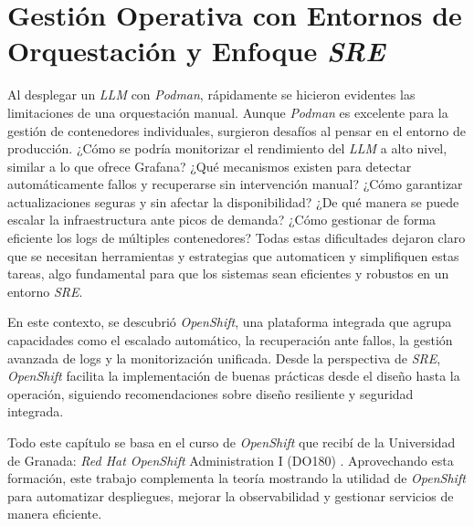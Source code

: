 \chapter{Gestión Operativa con Entornos de Orquestación y Enfoque \textit{SRE}}
Al desplegar un \textit{LLM} con \textit{Podman}, rápidamente se hicieron evidentes las limitaciones de una orquestación manual. Aunque \textit{Podman} es excelente para la gestión de contenedores individuales, surgieron desafíos al pensar en el entorno de producción. ¿Cómo se podría monitorizar el rendimiento del \textit{LLM} a alto nivel, similar a lo que ofrece Grafana? ¿Qué mecanismos existen para detectar automáticamente fallos y recuperarse sin intervención manual? ¿Cómo garantizar actualizaciones seguras y sin afectar la disponibilidad? ¿De qué manera se puede escalar la infraestructura ante picos de demanda? ¿Cómo gestionar de forma eficiente los logs de múltiples contenedores? Todas estas dificultades dejaron claro que se necesitan herramientas y estrategias que automaticen y simplifiquen estas tareas, algo fundamental para que los sistemas sean eficientes y robustos en un entorno \textit{SRE}.

En este contexto, se descubrió \textit{OpenShift}, una plataforma integrada que agrupa capacidades como el escalado automático, la recuperación ante fallos, la gestión avanzada de logs y la monitorización unificada. Desde la perspectiva de \textit{SRE}, \textit{OpenShift} facilita la implementación de buenas prácticas desde el diseño hasta la operación, siguiendo recomendaciones sobre diseño resiliente y seguridad integrada.

Todo este capítulo se basa en el curso de \textit{OpenShift} que recibí de la Universidad de Granada: \textit{Red Hat OpenShift} Administration I (DO180) \cite{ref33} \cite{ref61} . Aprovechando esta formación, este trabajo complementa la teoría mostrando la utilidad de \textit{OpenShift} para automatizar despliegues, mejorar la observabilidad y gestionar servicios de manera eficiente.

